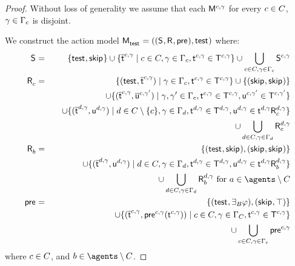 \begin{proof}
Without loss of generality we assume that each $\aModel[\agentC, \gamma]$ for every $\agentC \in \agentsC$, $\gamma \in \Gamma_\agentC$ is disjoint.

We construct the action model $\aPModelAndTuple{\aStateTest}$ where:
\begin{eqnarray*}
    \aStates &=& \{\aStateTest, \aStateSkip\} \cup \{\aPStateT[\agentC, \gamma] \mid \agentC \in \agentsC, \gamma \in \Gamma_\agentC, \aStateT[\agentC, \gamma] \in \aStatesT[\agentC, \gamma]\} \cup \bigcup_{\agentC \in \agentsC, \gamma \in \Gamma_\agentC} \aStates[\agentC, \gamma]\\
    \aAccessibilityC &=& \{(\aStateTest, \aPStateT[\agentC, \gamma]) \mid \gamma \in \Gamma_\agentC, \aStateT[\agentC, \gamma] \in \aStatesT[\agentC, \gamma]\} \cup \{(\aStateSkip, \aStateSkip)\} \\&&\quad \cup \{(\aPStateT[\agentC, \gamma], \aPStateU[\agentC, \gamma']) \mid \gamma, \gamma' \in \Gamma_\agentC, \aStateT[\agentC, \gamma] \in \aStatesT[\agentC, \gamma], \aStateU[\agentC, \gamma'] \in \aStatesT[\agentC, \gamma']\} \\&& \quad \cup \{(\aPStateT[\agentD, \gamma], \aStateU[\agentD, \gamma]) \mid \agentD \in \agentsC \setminus \{\agentC\}, \gamma \in \Gamma_\agentD, \aStateT[\agentD, \gamma] \in \aStatesT[\agentD, \gamma], \aStateU[\agentD, \gamma] \in \aSuccessorsC[\agentD, \gamma]{\aStateT[\agentD, \gamma]}\}  \\&& \quad \cup \bigcup_{\agentD \in \agentsC, \gamma \in \Gamma_\agentD} \aAccessibilityC[\agentD, \gamma]\\
    \aAccessibilityB &=& \{(\aStateTest, \aStateSkip), (\aStateSkip, \aStateSkip)\} \\&& \quad \cup \{(\aPStateT[\agentD, \gamma], \aStateU[\agentD, \gamma]) \mid \agentD \in \agentsC, \gamma \in \Gamma_\agentD, \aStateT[\agentD, \gamma] \in \aStatesT[\agentD, \gamma], \aStateU[\agentD, \gamma] \in \aSuccessorsB[\agentD, \gamma]{\aStateT[\agentD, \gamma]}\} \\&&\quad \cup \bigcup_{\agentD \in \agentsC, \gamma \in \Gamma_\agentD} \aAccessibilityB[\agentD, \gamma] \text{ for } \agentA \in \agents \setminus \agentsC\\
    \aPrecondition &=& \{(\aStateTest, \someactsBs \phi), (\aStateSkip, \top)\} \\&&\quad \cup \{(\aPStateT[\agentC, \gamma], \aPrecondition[\agentC, \gamma](\aStateT[\agentC, \gamma])) \mid \agentC \in \agentsC, \gamma \in \Gamma_\agentsC, \aStateT[\agentC, \gamma] \in \aStatesT[\agentC, \gamma]\} \\&&\quad \cup \bigcup_{\agentC \in \agentsC, \gamma \in \Gamma_\agentC} \aPrecondition[\agentC, \gamma]
\end{eqnarray*}
where $\agentC \in \agentsC$, and $\agentB \in \agents \setminus \agentsC$.


\end{proof}
